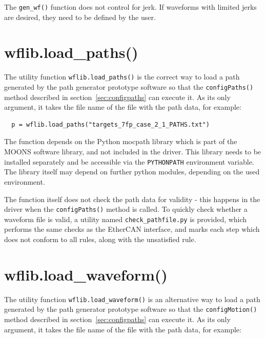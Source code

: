 \documentclass[fontsize=12,a4paper]{scrreprt}
\begin{document}
The \texttt{gen\_wf()} function does not control for jerk. If
waveforms with limited jerks are desired, they need to be defined by
the user.




\section{wflib.load\_paths()}
%
%
%
%
The utility function \texttt{wflib.load\_paths()} is the correct way
to load a path generated by the path generator prototype software so
that the \texttt{configPaths()} method described in
section~\ref{sec:configpaths} can execute it. As its only
argument, it takes the file name of the file with the path
data, for example:

\begin{verbatim}
  p = wflib.load_paths("targets_7fp_case_2_1_PATHS.txt")
\end{verbatim}

The function depends on the Python mocpath library which is part of
the MOONS software library, and not included in the driver.  This
library needs to be installed separately and be accessible via the
\texttt{PYTHONPATH} environment variable. The library itself may
depend on further python modules, depending on the used environment.

%

The function itself does not check the path data for validity - this
happens in the driver when the \texttt{configPaths()} method is
called. To quickly check whether a waveform file is valid, a utility
named \texttt{check\_pathfile.py} is provided, which performs the same
checks as the EtherCAN interface, and marks each step which does not conform to
all rules, along with the unsatisfied rule.


\section{wflib.load\_waveform()}
%
%
%
The utility function \texttt{wflib.load\_waveform()} is an alternative
way to load a path generated by the path generator prototype software
so that the \texttt{configMotion()} method described in
section~\ref{sec:configpaths} can execute it. As its only argument, it
takes the file name of the file with the path data, for example:
\end{document}
